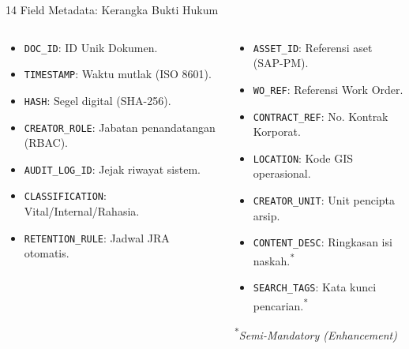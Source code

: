\documentclass[aspectratio=169,11pt]{beamer}
\begin{document}
\begin{frame}{14 Field Metadata: Kerangka Bukti Hukum}
    \vspace{0.2cm}
    \begin{columns}
        \begin{premiumbox}
            \tiny
            \begin{itemize}
                \item \texttt{DOC\_ID}: ID Unik Dokumen.
                \item \texttt{TIMESTAMP}: Waktu mutlak (ISO 8601).
                \item \texttt{HASH}: Segel digital (SHA-256).
                \item \texttt{CREATOR\_ROLE}: Jabatan penandatangan (RBAC).
                \item \texttt{AUDIT\_LOG\_ID}: Jejak riwayat sistem.
                \item \texttt{CLASSIFICATION}: Vital/Internal/Rahasia.
                \item \texttt{RETENTION\_RULE}: Jadwal JRA otomatis.
            \end{itemize}
        \end{premiumbox}
        
        \begin{orangebox}
            \tiny
            \begin{itemize}
                \item \texttt{ASSET\_ID}: Referensi aset (SAP-PM).
                \item \texttt{WO\_REF}: Referensi Work Order.
                \item \texttt{CONTRACT\_REF}: No. Kontrak Korporat.
                \item \texttt{LOCATION}: Kode GIS operasional.
                \item \texttt{CREATOR\_UNIT}: Unit pencipta arsip.
                \item \texttt{CONTENT\_DESC}: Ringkasan isi naskah.\textsuperscript{*}
                \item \texttt{SEARCH\_TAGS}: Kata kunci pencarian.\textsuperscript{*}
            \end{itemize}
            \vspace{0.1cm}
            \textsuperscript{*}\textit{Semi-Mandatory (Enhancement)}
        \end{orangebox}
    \end{columns}
\end{frame}
\end{document}
